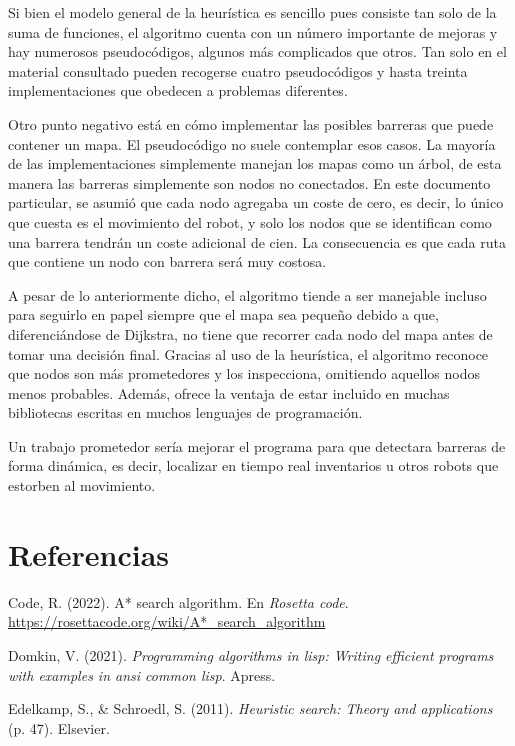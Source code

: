 \documentclass[a4paper,12pt]{article}
\begin{document}
Si bien el modelo general de la heurística es sencillo pues consiste tan solo de la suma de funciones, el algoritmo cuenta con un número importante de mejoras y hay numerosos pseudocódigos, algunos más complicados que otros. Tan solo en el material consultado pueden recogerse cuatro pseudocódigos y hasta treinta implementaciones que obedecen a problemas diferentes.

Otro punto negativo está en cómo implementar las posibles barreras que puede contener un mapa. El pseudocódigo no suele contemplar esos casos. La mayoría de las implementaciones simplemente manejan los mapas como un árbol, de esta manera las barreras simplemente son nodos no conectados. En este documento particular, se asumió que cada nodo agregaba un coste de cero, es decir, lo único que cuesta es el movimiento del robot, y solo los nodos que se identifican como una barrera tendrán un coste adicional de cien. La consecuencia es que cada ruta que contiene un nodo con barrera será muy costosa.

A pesar de lo anteriormente dicho, el algoritmo tiende a ser manejable incluso para seguirlo en papel siempre que el mapa sea pequeño debido a que, diferenciándose de Dijkstra, no tiene que recorrer cada nodo del mapa antes de tomar una decisión final. Gracias al uso de la heurística, el algoritmo reconoce que nodos son más prometedores y los inspecciona, omitiendo aquellos nodos menos probables. Además, ofrece la ventaja de estar incluido en muchas bibliotecas escritas en muchos lenguajes de programación.

Un trabajo prometedor sería mejorar el programa para que detectara barreras de forma dinámica, es decir, localizar en tiempo real inventarios u otros robots que estorben al movimiento.

\section*{Referencias}
\label{sec:orgc36c513}
\begin{hangparas}{1.5em}{1}
\hypertarget{citeproc_bib_item_1}{Code, R. (2022). A* search algorithm. En \textit{Rosetta code}. \url{https://rosettacode.org/wiki/A*_search_algorithm}}

\hypertarget{citeproc_bib_item_2}{Domkin, V. (2021). \textit{Programming algorithms in lisp: Writing efficient programs with examples in ansi common lisp}. Apress.}

\hypertarget{citeproc_bib_item_3}{Edelkamp, S., \& Schroedl, S. (2011). \textit{Heuristic search: Theory and applications} (p. 47). Elsevier.}
\end{hangparas}
\end{document}
